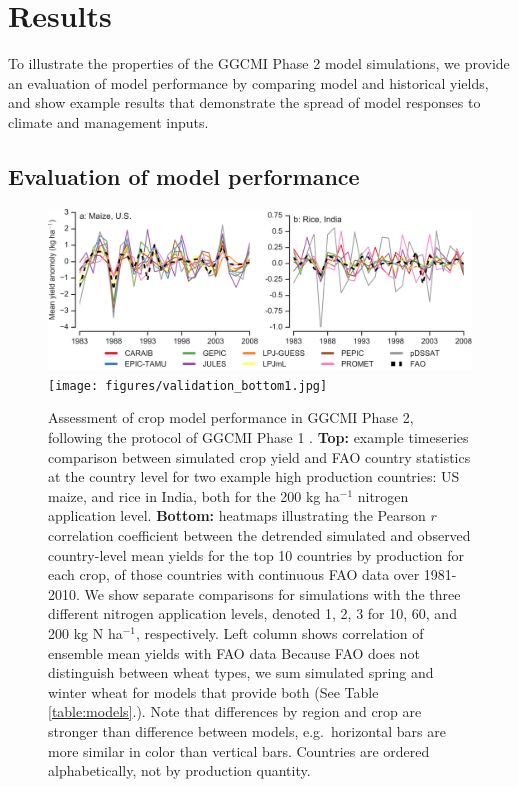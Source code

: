 \documentclass[gmd, manuscript]{copernicus} %
\begin{document}
\section{Results}
\label{S:4}

To illustrate the properties of the GGCMI Phase 2 model simulations, we provide an evaluation of model performance by comparing model and historical yields, and show example results that demonstrate the spread of model responses to climate and management inputs. 

\subsection{Evaluation of model performance}
\begin{figure}[ht]
  \centering
  \includegraphics[width=14.5cm]{figures/validation_top.png}
  \texttt{[image: figures/validation\_bottom1.jpg]}
  \caption{
  Assessment of crop model performance in GGCMI Phase 2, following the protocol of GGCMI Phase 1 \citep{muller_global_2017}. 
  \textbf{Top:} example timeseries comparison between simulated crop yield and FAO country statistics \citep{FAOSTAT} at the country level for two example high production countries: US maize, and rice in India, both for the 200 kg ha$^{-1}$ nitrogen application level. 
  \textbf{Bottom:} heatmaps illustrating the Pearson $r$ correlation coefficient between the detrended simulated and observed country-level mean yields for the top 10 countries by production for each crop, of those countries with continuous FAO data over 1981-2010.
  We show separate comparisons for simulations with the three different nitrogen application levels, denoted 1, 2, 3 for 10, 60, and 200 kg N ha$^{-1}$, respectively. 
  Left column shows correlation of ensemble mean yields with FAO data 
  Because FAO does not distinguish between wheat types, we sum simulated spring and winter wheat for models that provide both (See Table \ref{table:models}.). 
  Note that differences by region and crop are stronger than difference between models, e.g.\ horizontal bars are more similar in color than vertical bars.
  Countries are ordered alphabetically, not by production quantity.
  }
  \label{fig:simulation_val}
\end{figure}
\end{document}
